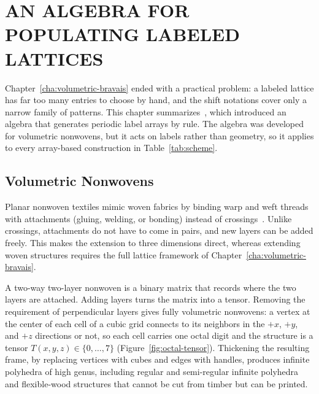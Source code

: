 %
%

\chapter{\uppercase{An Algebra for Populating Labeled Lattices}}
\label{cha:nonwoven}

Chapter~\ref{cha:volumetric-bravais} ended with a practical problem: a labeled lattice has far too many entries to choose by hand, and the shift notations cover only a narrow family of patterns. This chapter summarizes~\cite{yildiz2024nonwoven}, which introduced an algebra that generates periodic label arrays by rule. The algebra was developed for volumetric nonwovens, but it acts on labels rather than geometry, so it applies to every array-based construction in Table~\ref{tab:scheme}.

\section{Volumetric Nonwovens}

Planar nonwoven textiles mimic woven fabrics by binding warp and weft threads with attachments (gluing, welding, or bonding) instead of crossings~\cite{zarrinmehr2023satin}. Unlike crossings, attachments do not have to come in pairs, and new layers can be added freely. This makes the extension to three dimensions direct, whereas extending woven structures requires the full lattice framework of Chapter~\ref{cha:volumetric-bravais}.

A two-way two-layer nonwoven is a binary matrix that records where the two layers are attached. Adding layers turns the matrix into a tensor. Removing the requirement of perpendicular layers gives fully volumetric nonwovens: a vertex at the center of each cell of a cubic grid connects to its neighbors in the $+x$, $+y$, and $+z$ directions or not, so each cell carries one octal digit and the structure is a tensor $T(x,y,z)\in\{0,\ldots,7\}$ (Figure~\ref{fig:octal-tensor}). Thickening the resulting frame, by replacing vertices with cubes and edges with handles, produces infinite polyhedra of high genus, including regular and semi-regular infinite polyhedra~\cite{coxeter1938regular,grunbaum1993infinite} and flexible-wood structures that cannot be cut from timber but can be printed.

